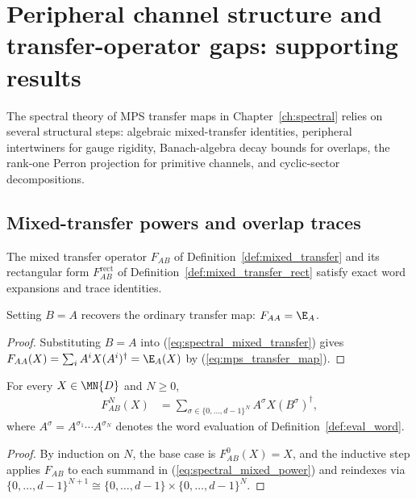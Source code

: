 \chapter{Peripheral channel structure and transfer-operator gaps: supporting results}
\label{ch:spectral_supporting_results}

The spectral theory of MPS transfer maps in Chapter~\ref{ch:spectral} relies on
several structural steps: algebraic mixed-transfer identities, peripheral
intertwiners for gauge rigidity, Banach-algebra decay bounds for overlaps, the
rank-one Perron projection for primitive channels, and cyclic-sector
decompositions.

\section{Mixed-transfer powers and overlap traces}
\label{sec:app_spectral_mixed_trace}

The mixed transfer operator $F_{AB}$ of Definition~\ref{def:mixed_transfer}
and its rectangular form $F_{AB}^{\mathrm{rect}}$ of
Definition~\ref{def:mixed_transfer_rect} satisfy exact word expansions and trace
identities.

\begin{lemma}\label{thm:mixed_self}
    \leanok
    Setting $B=A$ recovers the ordinary transfer map: $F_{AA}=\E_A$.
\end{lemma}

\begin{proof}\leanok
    Substituting $B=A$ into (\ref{eq:spectral_mixed_transfer}) gives
    $F_{AA}(X)=\sum_iA^iX(A^i)^\dagger=\E_A(X)$ by
    (\ref{eq:mps_transfer_map}).
\end{proof}

\begin{lemma}\label{thm:mixed_pow}
    \leanok
    For every $X\in\MN{D}$ and $N\geq0$,
    \begin{align}
        F_{AB}^N(X)
         & =\sum_{\sigma\in\{0,\ldots,d{-}1\}^N}
        A^\sigma X(B^\sigma)^\dagger,
        \label{eq:spectral_mixed_power}
    \end{align}
    where $A^\sigma=A^{\sigma_1}\cdots A^{\sigma_N}$ denotes the word
    evaluation of Definition~\ref{def:eval_word}.
\end{lemma}

\begin{proof}
    \leanok
    By induction on $N$, the base case is $F_{AB}^0(X)=X$, and the inductive
    step applies $F_{AB}$ to each summand in
    (\ref{eq:spectral_mixed_power}) and reindexes via
    $\{0,\ldots,d{-}1\}^{N+1}\cong
        \{0,\ldots,d{-}1\}\times\{0,\ldots,d{-}1\}^N$.
\end{proof}


